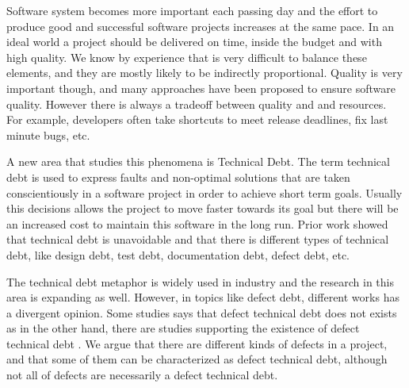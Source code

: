 Software system becomes more important each passing day and the effort to produce good and successful software projects increases at the same pace. In an ideal world a project  should be delivered on time, inside the budget and with high quality. We know by experience that is very  difficult to balance these elements, and they are mostly likely to be indirectly proportional. Quality is very important though, and many approaches have been proposed to ensure software quality. However there is always a tradeoff between quality and and resources. For example, developers often take shortcuts to meet release deadlines, fix last minute bugs, etc. 

A new area that studies this phenomena is Technical Debt. The term technical debt is used to express faults and non-optimal solutions that are taken conscientiously in a software project in order to achieve short term goals. Usually  this decisions allows the project to move faster towards its goal but there will be an increased cost to maintain this software in the long run. Prior work \cite{Lim2012Software} showed that technical debt is unavoidable and that there is different types of technical debt, like design debt, test debt, documentation debt, defect debt, etc.  

The technical debt metaphor is widely used in industry and the research in this area is expanding as well. However, in topics like defect debt, different works has a divergent opinion. Some studies says that defect technical debt does not exists \cite{Kruchten2013GSOFT} as in the other hand, there are studies supporting the existence of defect technical debt \cite{Seaman201125}.  We argue that there are different kinds of defects in a project, and that some of them can be characterized as defect technical debt, although not all of defects are necessarily  a defect technical debt. 

